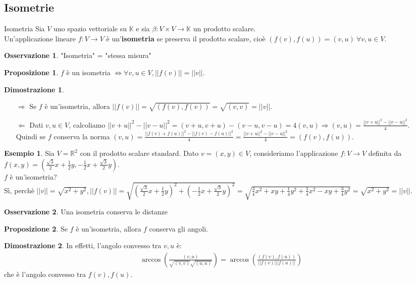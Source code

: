 \documentclass[a4paper]{article}
\theoremstyle{definition}
\newtheorem*{oss}{Osservazione}
\newtheorem*{dimm}{Dimostrazione}
\newtheorem*{es}{Esempio}
\newtheorem*{prop}{Proposizione}
\begin{document}
	\subsection{Isometrie}
	\begin{deff}{Isometria}{}
		Sia $V$ uno spazio vettoriale su $\mathbb{K}$ e sia $\beta: V \times V \to \mathbb{K}$ un prodotto scalare. \\
		Un'applicazione lineare $f: V \to V$ è un'\textbf{isometria} se preserva il prodotto scalare, cioè $(f(v), f(u)) = (v, u) \ \forall v, u \in V$.
	\end{deff}
	\begin{oss}
		"Isometria" = "stessa misura"
	\end{oss}
	\begin{prop}
		$f$ è un isometria $\Leftrightarrow \forall v, u \in V, ||f(v)|| = ||v||$.
	\end{prop}
	\begin{dimm}
		\begin{itemize}
			\item[$\Rightarrow$] Se $f$ è un'isometria, allora $||f(v)|| = \sqrt{(f(v), f(v))} = \sqrt{(v, v)} = ||v||$.
			\item[$\Leftarrow$] Dati $v, u \in V$, calcoliamo $||v + u||^2 - ||v - u||^2 = (v + u, v + u) - (v - u, v - u) = 4(v, u) \Rightarrow (v, u) = \frac{||v + u||^2 - ||v - u||^2}{4}$. \\
			Quindi se $f$ conserva la norma $(v, u) = \frac{||f(v) + f(u)||^2 - ||f(v) - f(u)||^2}{4} = \frac{||v + u||^2 - ||v - u||^2}{4} = (f(v), f(u))$.
		\end{itemize}
	\end{dimm}

	\begin{es}
		Sia $V = \mathbb{R}^2$ con il prodotto scalare standard. Dato $v = (x, y) \in V$, consideriamo l'applicazione $f: V \to V$ definita da $f(x, y) = (\frac{\sqrt{3}}{2}x + \frac{1}{2}y, -\frac{1}{2}x + \frac{\sqrt{3}}{2}y)$. \\
		$f$ è un'isometria? \\
		Sì, perchè $||v|| = \sqrt{x^2 + y^2},
		||f(v)|| = \sqrt{(\frac{\sqrt{3}}{2}x + \frac{1}{2}y)^2 + (-\frac{1}{2}x + \frac{\sqrt{3}}{2}y)^2} = \sqrt{\frac{3}{4}x^2 + xy + \frac{1}{4}y^2 + \frac{1}{4}x^2 - xy + \frac{3}{4}y^2} = \sqrt{x^2 + y^2} = ||v||$.
	\end{es}

	\begin{oss}
		Una isometria conserva le distanze
	\end{oss}
	\begin{prop}
		Se $f$ è un'isometria, allora $f$ conserva gli angoli.
	\end{prop}
	\begin{dimm}
		In effetti, l'angolo convesso tra $v, u$ è:
		\begin{align*}
			\arccos\left(\frac{(v, u)}{\sqrt{(v, v)}\sqrt{(u, u)}}\right) = \arccos\left(\frac{(f(v), f(u))}{||f(v)|||f(u)||}\right)
		\end{align*}
		che è l'angolo convesso tra $f(v), f(u)$.
	\end{dimm}
\end{document}
